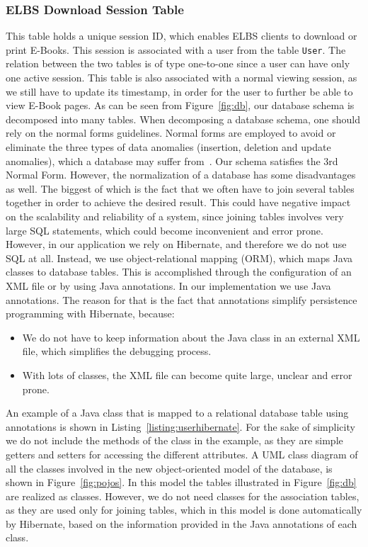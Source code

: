 \subsubsection{ELBS Download Session Table}
This table holds a unique session ID, which enables ELBS clients to download or print E-Books. This session is associated with a user from the table \verb=User=. The relation between the two tables is of type one-to-one since a user can have only one active session. This table is also associated with a normal viewing session, as we still have to update its timestamp, in order for the user to further be able to
view E-Book pages.  
\newline
As can be seen from Figure~\ref{fig:db}, our database schema is decomposed into many tables. 
When decomposing a database schema, one should rely on the normal forms guidelines.  Normal forms are employed
to avoid or eliminate the three types of data anomalies (insertion, deletion and update
anomalies), which a database may suffer from~\cite[Chapter~14]{bdb1}. Our schema
satisfies the 3rd Normal Form. However, the normalization of a database has some disadvantages as well. The
biggest of which is the fact that we often have to join several tables together in order to achieve the desired result. 
This could have negative impact on the scalability and reliability of a system, since
joining tables involves very large SQL statements, which could become
inconvenient and error prone. However, in our application we rely on Hibernate, and therefore we do not 
use SQL at all. Instead, we use object-relational mapping (ORM), which maps
Java classes to database tables. This is accomplished through the configuration 
of an XML file or by using Java annotations. In our implementation we use Java annotations. The reason for
that is the fact that annotations 
simplify persistence programming with Hibernate, because:
 
\begin{itemize}
	\item	We do not have to keep information about the Java class in an external XML file, 
	which simplifies the debugging process. 
	\item With lots of classes, the XML file can become quite large, unclear and error prone.
\end{itemize}

An example of a Java class that is mapped to a relational database table using annotations
is shown in Listing~\ref{listing:userhibernate}.
For the
sake of simplicity we do not include the methods of the class in the example, as they are simple getters and
setters for accessing the different attributes.
A UML class diagram of all the classes involved in the new object-oriented model of the database, is shown
in Figure~\ref{fig:pojos}. In this model the tables illustrated in Figure~\ref{fig:db} 
are realized as classes. However, we do not need classes for the association tables, 
as they are used only for joining tables, which in this model is done automatically
by Hibernate, based on the information provided in the Java annotations of each class. 

